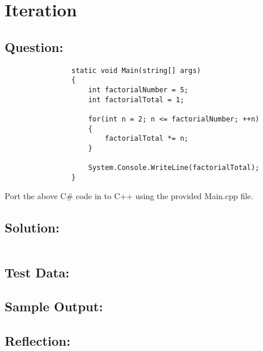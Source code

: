 \documentclass[main.tex]{subfiles}
\begin{document}
    \section{Iteration}
        \subsection*{Question:}
            \begin{verbatim}
                static void Main(string[] args)
                {
                    int factorialNumber = 5;
                    int factorialTotal = 1;

                    for(int n = 2; n <= factorialNumber; ++n)
                    {
                        factorialTotal *= n;
                    }

                    System.Console.WriteLine(factorialTotal);
                }
            \end{verbatim}
            Port the above C\# code in to C++ using the provided Main.cpp file.
            
        \subsection*{Solution:}
            \inputminted{cpp}{../05-Iteration/Iteration.cpp}

        \subsection*{Test Data:}
        
        \subsection*{Sample Output:}

        \subsection*{Reflection:}
\end{document}
